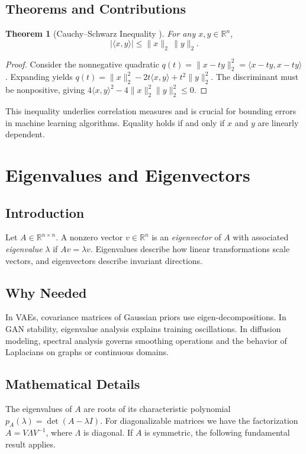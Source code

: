 \documentclass[11pt]{book}
\newtheorem{theorem}{Theorem}[chapter]
\begin{document}
\subsection{Theorems and Contributions}
\begin{theorem}[Cauchy--Schwarz Inequality \cite{cauchy1821,schwarz1888}]
For any $x,y\in\mathbb{R}^n$,
\begin{equation}
|\langle x,y\rangle|\le \|x\|_2\,\|y\|_2.
\end{equation}
\end{theorem}
\begin{proof}
Consider the nonnegative quadratic $q(t)=\|x-ty\|_2^2=\langle x-ty,x-ty\rangle$. Expanding yields $q(t)=\|x\|_2^2-2t\langle x,y\rangle+t^2\|y\|_2^2$. The discriminant must be nonpositive, giving $4\langle x,y\rangle^2-4\|x\|_2^2\|y\|_2^2\le0$.
\end{proof}
This inequality underlies correlation measures and is crucial for bounding errors in machine learning algorithms. Equality holds if and only if $x$ and $y$ are linearly dependent.

\section{Eigenvalues and Eigenvectors}
\subsection{Introduction}
Let $A\in\mathbb{R}^{n\times n}$. A nonzero vector $v\in\mathbb{R}^n$ is an \emph{eigenvector} of $A$ with associated \emph{eigenvalue} $\lambda$ if $Av=\lambda v$. Eigenvalues describe how linear transformations scale vectors, and eigenvectors describe invariant directions.

\subsection{Why Needed}
In VAEs, covariance matrices of Gaussian priors use eigen-decompositions. In GAN stability, eigenvalue analysis explains training oscillations. In diffusion modeling, spectral analysis governs smoothing operations and the behavior of Laplacians on graphs or continuous domains.

\subsection{Mathematical Details}
The eigenvalues of $A$ are roots of its characteristic polynomial $p_A(\lambda)=\det(A-\lambda I)$. For diagonalizable matrices we have the factorization $A=V\Lambda V^{-1}$, where $\Lambda$ is diagonal. If $A$ is symmetric, the following fundamental result applies.
\end{document}
